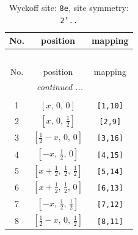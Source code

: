 \documentclass[fleqn,8pt]{jsarticle}
\begin{document}
\renewcommand{\arraystretch}{1.2}
\begin{longtable}{ccc}
\caption{Wyckoff site: {\tt 8e}, site symmetry: {\tt 2'..}}
 \\
 \hline \hline
No. & position & mapping \\ \hline \endfirsthead

\multicolumn{2}{l}{\tablename\ \thetable{}} \\
 \hline \hline
No. & position & mapping \\ \hline \endhead

 \hline \hline
\multicolumn{2}{r}{\footnotesize\it continued ...} \\ \endfoot

 \hline \hline
\multicolumn{2}{r}{} \\ \endlastfoot

1 & $\left[ x,\, 0,\, 0 \right]$ & {\tt [1,10]} \\ \hline
2 & $\left[ x,\, 0,\, \frac{1}{2} \right]$ & {\tt [2,9]} \\ \hline
3 & $\left[ \frac{1}{2} - x,\, 0,\, 0 \right]$ & {\tt [3,16]} \\ \hline
4 & $\left[ - x,\, \frac{1}{2},\, 0 \right]$ & {\tt [4,15]} \\ \hline
5 & $\left[ x + \frac{1}{2},\, \frac{1}{2},\, \frac{1}{2} \right]$ & {\tt [5,14]} \\ \hline
6 & $\left[ x + \frac{1}{2},\, \frac{1}{2},\, 0 \right]$ & {\tt [6,13]} \\ \hline
7 & $\left[ - x,\, \frac{1}{2},\, \frac{1}{2} \right]$ & {\tt [7,12]} \\ \hline
8 & $\left[ \frac{1}{2} - x,\, 0,\, \frac{1}{2} \right]$ & {\tt [8,11]} \\
\end{longtable}
\renewcommand{\arraystretch}{1.2}
\end{document}
